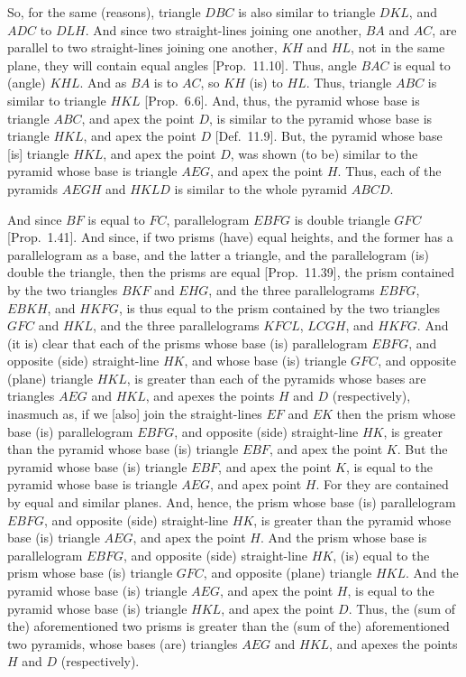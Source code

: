 \begin{Parallel}{}{}
{So, for the same (reasons), triangle $DBC$ is also similar to triangle $DKL$, and
$ADC$ to $DLH$. And since two straight-lines joining one another, $BA$ and $AC$, are parallel
to two straight-lines joining one another, $KH$ and $HL$, not in the same plane, they will
contain equal angles [Prop.~11.10]. Thus, angle $BAC$ is equal
to (angle) $KHL$. And as $BA$ is to $AC$, so $KH$ (is) to $HL$. Thus, triangle $ABC$ is
similar to triangle $HKL$ [Prop.~6.6]. And, thus, the pyramid whose base is triangle $ABC$, and apex
the point $D$, is similar to the pyramid whose base is triangle $HKL$, and apex the point $D$ [Def.~11.9]. But,
the pyramid whose base [is] triangle $HKL$, and apex the point $D$, was shown (to be) similar
to the pyramid whose base is triangle $AEG$, and apex the point $H$. Thus, each of the pyramids
$AEGH$ and $HKLD$ is similar to the whole pyramid $ABCD$.

And since $BF$ is equal to $FC$, parallelogram $EBFG$ is double triangle $GFC$ [Prop.~1.41]. And since, if two prisms (have) 
equal heights, and the former has a parallelogram as a base, and the latter a triangle, and the parallelogram (is) double
the triangle, then the prisms are equal [Prop.~11.39],  the prism
contained by the two triangles $BKF$ and $EHG$, and the three parallelograms $EBFG$,
$EBKH$, and $HKFG$, is thus  equal to the prism contained by the two triangles $GFC$ and
$HKL$, and the three parallelograms $KFCL$, $LCGH$, and $HKFG$. And (it is) clear that
each of the prisms whose base (is) parallelogram $EBFG$, and opposite (side) straight-line
$HK$, and whose base (is) triangle $GFC$, and opposite (plane) triangle $HKL$, is greater than
each of the pyramids whose bases are triangles $AEG$ and $HKL$, and apexes the points
$H$ and $D$ (respectively), inasmuch as, if we [also] join the straight-lines
$EF$ and $EK$ then the prism whose base (is) parallelogram $EBFG$, and opposite
(side) straight-line $HK$, is greater than the pyramid whose base (is) triangle $EBF$,
and apex the point $K$. But the pyramid whose base (is) triangle $EBF$, and apex the point $K$,
is equal to the pyramid whose base is triangle $AEG$, and apex point $H$. For
they are contained by equal and similar planes. And, hence, the prism whose base (is)
parallelogram $EBFG$, and opposite (side) straight-line $HK$, is greater than the pyramid
whose base (is) triangle $AEG$, and apex the  point $H$. And the prism 
whose base is
parallelogram $EBFG$, and opposite (side) straight-line $HK$, (is) equal to the prism
whose base (is) triangle $GFC$, and opposite (plane) triangle $HKL$. And the pyramid whose
base (is) triangle $AEG$, and apex the  point $H$, is equal to the pyramid whose base (is) triangle
$HKL$, and apex the point $D$. Thus, the (sum of the) aforementioned
two prisms is greater than the (sum of the) aforementioned two pyramids, whose bases (are)
triangles $AEG$ and $HKL$, and apexes the points $H$ and $D$ (respectively).

}
\end{Parallel}
